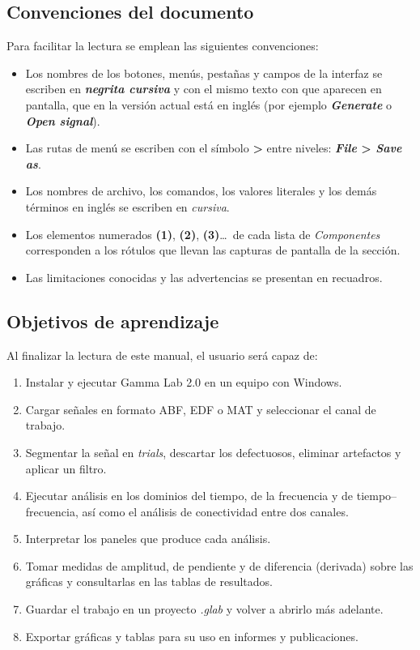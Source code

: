 \documentclass[11pt,a4paper]{article}
\newcounter{captura}
\begin{document}
    \subsection{Convenciones del documento}
    Para facilitar la lectura se emplean las siguientes convenciones:

    \begin{itemize}
        \item Los nombres de los botones, men\'us, pesta\~nas y campos de la interfaz se escriben en \textbf{\textit{negrita cursiva}} y con el mismo texto con que aparecen en pantalla, que en la versi\'on actual est\'a en ingl\'es (por ejemplo \textbf{\textit{Generate}} o \textbf{\textit{Open signal}}).
        \item Las rutas de men\'u se escriben con el s\'imbolo \textbf{>} entre niveles: \textbf{\textit{File} > \textit{Save as}}.
        \item Los nombres de archivo, los comandos, los valores literales y los dem\'as t\'erminos en ingl\'es se escriben en \textit{cursiva}.
        \item Los elementos numerados \textbf{(1)}, \textbf{(2)}, \textbf{(3)}\ldots\ de cada lista de \emph{Componentes} corresponden a los r\'otulos que llevan las capturas de pantalla de la secci\'on.
        \item Las limitaciones conocidas y las advertencias se presentan en recuadros.
    \end{itemize}

    \subsection{Objetivos de aprendizaje}
    Al finalizar la lectura de este manual, el usuario ser\'a capaz de:

    \begin{enumerate}
        \item Instalar y ejecutar Gamma Lab 2.0 en un equipo con Windows.
        \item Cargar se\~nales en formato ABF, EDF o MAT y seleccionar el canal de trabajo.
        \item Segmentar la se\~nal en \textit{trials}, descartar los defectuosos, eliminar artefactos y aplicar un filtro.
        \item Ejecutar an\'alisis en los dominios del tiempo, de la frecuencia y de tiempo--frecuencia, as\'i como el an\'alisis de conectividad entre dos canales.
        \item Interpretar los paneles que produce cada an\'alisis.
        \item Tomar medidas de amplitud, de pendiente y de diferencia (derivada) sobre las gr\'aficas y consultarlas en las tablas de resultados.
        \item Guardar el trabajo en un proyecto \textit{.glab} y volver a abrirlo m\'as adelante.
        \item Exportar gr\'aficas y tablas para su uso en informes y publicaciones.
    \end{enumerate}
\end{document}
